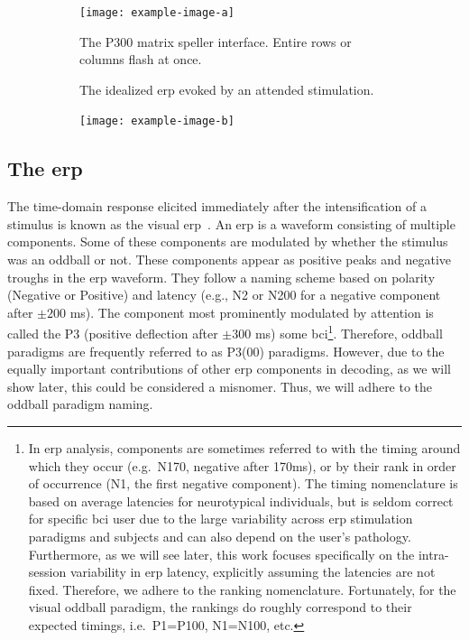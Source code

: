 \begin{figure}[t]
  \begin{subfigure}[t]{.45\textwidth}
  \texttt{[image: example-image-a]}
  \end{subfigure}\hfill%
  \begin{subfigure}[t]{.45\textwidth}
    
    \caption{The P300 matrix speller interface. Entire rows or columns flash at once.}
  \end{subfigure}

  \begin{subfigure}[t]{.45\textwidth}
    
    \caption{The idealized \ac{erp} evoked by an attended stimulation.}
  \end{subfigure}\hfill%
  \begin{subfigure}[t]{.45\textwidth}
    \texttt{[image: example-image-b]}
  \end{subfigure}
\end{figure}


\subsection{The \acf{erp}}%
\label{sec:bci/oddball/erp}

The time-domain response elicited immediately after the intensification of a
stimulus is known as the visual \ac{erp}~\cite{Luck2014}.
An \ac{erp} is a waveform consisting of multiple components.
Some of these components are modulated by whether the stimulus was an
oddball or not.
These components appear as positive peaks and negative troughs in the \ac{erp}
waveform.
They follow a naming scheme based on polarity (Negative or Positive) and
latency (e.g., N2 or N200 for a negative component after $\pm200$ ms).
The component most prominently modulated by attention is called the P3
(positive deflection after $\pm300$ ms)
some \ac{bci}\footnote{In \ac{erp} analysis,
components are sometimes referred to with the timing around which they occur
(e.g.\ N170, negative after 170ms), or by their rank in order of occurrence
(N1, the first negative component).
The timing nomenclature is based on average latencies for neurotypical
individuals, but is seldom correct for specific \ac{bci} user due to the large
variability across \ac{erp} stimulation paradigms and subjects and can also
depend on the user's pathology.
Furthermore, as we will see later, this work focuses specifically on the
intra-session variability in \ac{erp} latency, explicitly assuming the latencies are not
fixed.
Therefore, we adhere to the ranking nomenclature.
Fortunately, for the visual oddball paradigm, the rankings do roughly
correspond to their expected timings, i.e.\ P1=P100, N1=N100, etc.}.
Therefore, oddball paradigms are frequently referred to as P3(00) paradigms.
However, due to the equally important contributions of other \ac{erp}
components in decoding, as we will show later, this could be considered a
misnomer.
Thus, we will adhere to the oddball paradigm naming.

